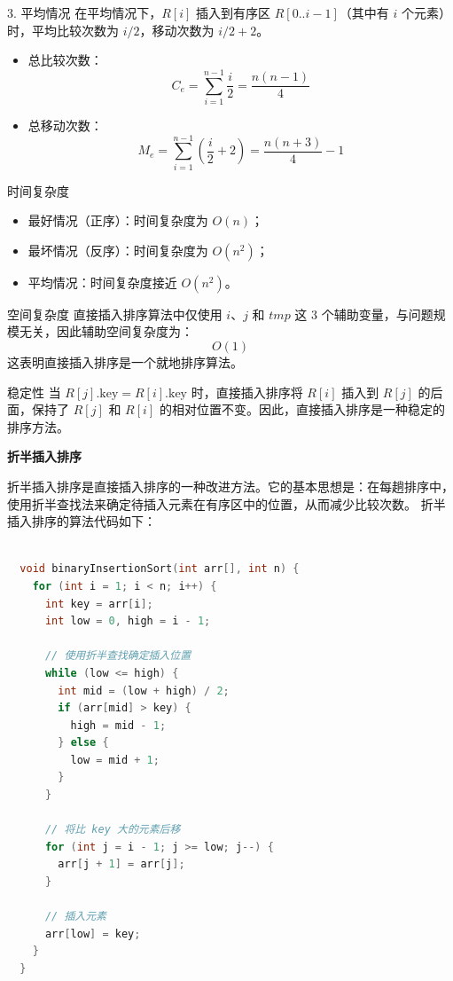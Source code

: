\documentclass[lang=cn,newtx,10pt,scheme=chinese]{../elegantbook}
\begin{document}
3. 平均情况  
   在平均情况下，$R[i]$ 插入到有序区 $R[0..i-1]$（其中有 $i$ 个元素）时，平均比较次数为 $i/2$，移动次数为 $i/2 + 2$。  
   \begin{itemize}
     \item 总比较次数：  
       \[
       C_e = \sum_{i=1}^{n-1} \frac{i}{2} = \frac{n(n-1)}{4}
       \]
     \item 总移动次数：  
       \[
       M_e = \sum_{i=1}^{n-1} \left(\frac{i}{2} + 2\right) = \frac{n(n+3)}{4} - 1
       \]
   \end{itemize}

时间复杂度  
\begin{itemize}
  \item 最好情况（正序）：时间复杂度为 $O(n)$；
  \item 最坏情况（反序）：时间复杂度为 $O(n^2)$；
  \item 平均情况：时间复杂度接近 $O(n^2)$。
\end{itemize}

空间复杂度  
直接插入排序算法中仅使用 $i$、$j$ 和 $tmp$ 这 3 个辅助变量，与问题规模无关，因此辅助空间复杂度为：
\[
O(1)
\]
这表明直接插入排序是一个就地排序算法。

稳定性  
当 $R[j].\text{key} = R[i].\text{key}$ 时，直接插入排序将 $R[i]$ 插入到 $R[j]$ 的后面，保持了 $R[j]$ 和 $R[i]$ 的相对位置不变。因此，直接插入排序是一种稳定的排序方法。

\textbf{折半插入排序}

折半插入排序是直接插入排序的一种改进方法。它的基本思想是：在每趟排序中，使用折半查找法来确定待插入元素在有序区中的位置，从而减少比较次数。
折半插入排序的算法代码如下：
\begin{lstlisting}[language=C++, caption=折半插入排序的算法代码]

  void binaryInsertionSort(int arr[], int n) {
    for (int i = 1; i < n; i++) {
      int key = arr[i];
      int low = 0, high = i - 1;

      // 使用折半查找确定插入位置
      while (low <= high) {
        int mid = (low + high) / 2;
        if (arr[mid] > key) {
          high = mid - 1;
        } else {
          low = mid + 1;
        }
      }

      // 将比 key 大的元素后移
      for (int j = i - 1; j >= low; j--) {
        arr[j + 1] = arr[j];
      }

      // 插入元素
      arr[low] = key;
    }
  }

  \end{lstlisting}
\end{document}
